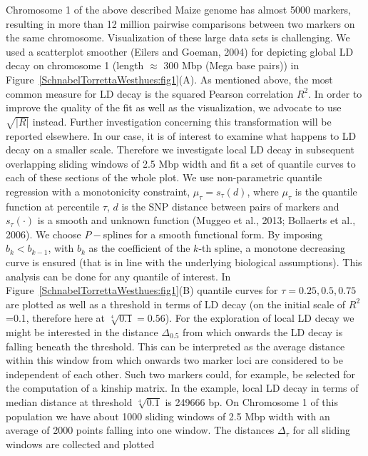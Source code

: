 \documentclass[twoside]{report}
\begin{document}
Chromosome 1 of the above described 
Maize genome has almost 5000 markers, resulting in more than 
12 million pairwise comparisons 
	between two markers on the same chromosome. Visualization of these large data sets is 
	challenging. We used a scatterplot smoother (Eilers and Goeman, 2004) for depicting
	global LD decay on chromosome 1 (length $\approx$ 300 Mbp (Mega base pairs))   
	in Figure~\ref{SchnabelTorrettaWesthues:fig1}(A). As mentioned above, the most 
	common measure for LD decay is the squared Pearson correlation $R^2$. In order to improve the 
	quality of the fit as well as the visualization, we advocate to use $\sqrt{|R|}$ instead. Further 
	investigation concerning this transformation will be reported elsewhere. 
	In our case, it is of interest to examine what happens to 
	LD decay on a smaller scale. Therefore we investigate local LD decay in subsequent 
	overlapping sliding windows of 2.5 Mbp width and fit a set of quantile curves to each of these 
	sections of the whole plot.  
	We use non-parametric quantile 
	regression with a monotonicity constraint,
	$\mu_{\tau}=s_{\tau}(d)$, where $\mu_\tau$ is the quantile function at 
	percentile $\tau$, $d$ is the SNP distance between pairs of markers and 
	$s_{\tau}(\cdot)$ is a smooth and unknown function (Muggeo et al., 2013; Bollaerts et al., 2006). 
	We choose $P-$splines for a smooth functional form. By imposing 
	$b_k<b_{k-1}$, with $b_{k}$ as the coefficient of the $k$-th spline, 
	a monotone decreasing curve is ensured (that is 
	in line with the underlying biological assumptions). This analysis can be done for any quantile 
	of interest. In Figure~\ref{SchnabelTorrettaWesthues:fig1}(B) quantile curves for 
	$\tau={0.25,0.5,0.75}$ are 
	plotted as well as a threshold in terms of LD decay (on the initial scale 
	of $R^2$=0.1, therefore here at $\sqrt[4]{0.1}=0.56$). For the exploration of local LD decay 
	we might be interested in the distance $\Delta_{0.5}$ from 
	which onwards the LD decay is falling beneath the threshold. This can be interpreted as the
	average distance within this window from which onwards two marker loci are considered to be 
	independent of each other. Such two markers could, for example, be selected for the computation
	of a kinship matrix. In the example, local 
		LD decay in terms of median distance at threshold $\sqrt[4]{0.1}$ is 249666 bp. 
	On Chromosome 1 of this population we have about 1000 sliding windows
	 of 2.5 Mbp width with an 
	average of 2000 points falling into one window. The distances 
	$\Delta_{\tau}$ for all sliding windows are collected and plotted 
\end{document}
